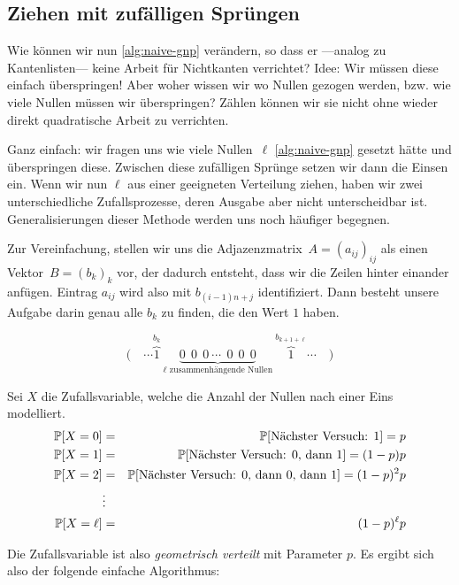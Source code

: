 \subsection{Ziehen mit zufälligen Sprüngen}
Wie können wir nun \cref{alg:naive-gnp} verändern, so dass er ---analog zu Kantenlisten--- keine Arbeit für Nichtkanten verrichtet?
Idee: Wir müssen diese einfach überspringen!
Aber woher wissen wir wo \glqq Nullen\grqq{} gezogen werden, bzw. wie viele Nullen müssen wir überspringen?
Zählen können wir sie nicht ohne wieder direkt quadratische Arbeit zu verrichten.

Ganz einfach: wir fragen uns wie viele Nullen~$\ell$ \cref{alg:naive-gnp} gesetzt hätte und überspringen diese.
Zwischen diese zufälligen Sprünge setzen wir dann die Einsen ein.
Wenn wir nun $\ell$ aus einer geeigneten Verteilung ziehen, haben wir zwei unterschiedliche Zufallsprozesse, deren Ausgabe aber nicht unterscheidbar ist.
Generalisierungen dieser Methode werden uns noch häufiger begegnen.

Zur Vereinfachung, stellen wir uns die Adjazenzmatrix~$A = (a_{ij})_{ij}$ als einen Vektor~$B = (b_k)_k$ vor, der dadurch entsteht, dass wir die Zeilen hinter einander anfügen.
Eintrag $a_{ij}$ wird also mit $b_{(i-1)n + j}$ identifiziert.
Dann besteht unsere Aufgabe darin genau alle $b_k$ zu finden, die den Wert $1$ haben.

\begin{equation}
    \Big(\quad \cdots \overbrace{1}^{b_k} \ \underbrace{0 \ \ 0\ \ 0 \ \cdots\ \ 0\ \ 0\ \ 0}_{\text{$\ell$ zusammenhängende Nullen}}\  \overbrace{1}^{b_{k + 1+ \ell}} \cdots \quad \Big)
\end{equation}

\noindent
Sei $X$ die Zufallsvariable, welche die Anzahl der Nullen nach einer Eins modelliert.
\begin{eqnarray}
    \mathbb{P}\!\left[X = 0\right] &=& \mathbb{P}\!\left[\text{Nächster Versuch: 1}\right] = p \\
    \mathbb{P}\!\left[X = 1\right] &=& \mathbb{P}\!\left[\text{Nächster Versuch: 0, dann 1}\right] = (1 - p)p \\
    \mathbb{P}\!\left[X = 2\right] &=& \mathbb{P}\!\left[\text{Nächster Versuch: 0, dann 0, dann 1}\right] = (1 - p)^2 p \\
    &\vdots& \\
    \mathbb{P}\!\left[X = \ell\right] &=& (1 - p)^\ell p
\end{eqnarray}

\noindent Die Zufallsvariable ist also \emph{geometrisch verteilt} mit Parameter $p$.
Es ergibt sich also der folgende einfache Algorithmus:

